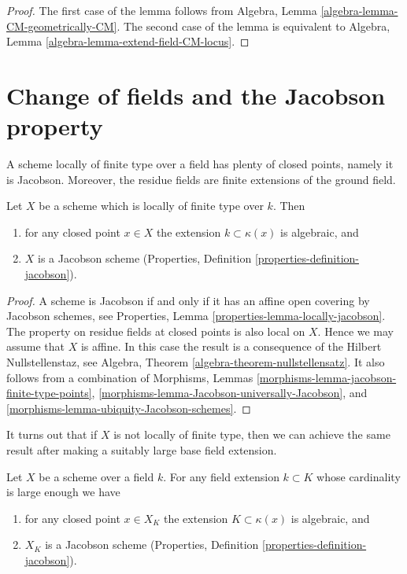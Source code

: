 \begin{proof}
The first case of the lemma follows from
Algebra, Lemma \ref{algebra-lemma-CM-geometrically-CM}.
The second case of the lemma is equivalent to
Algebra, Lemma \ref{algebra-lemma-extend-field-CM-locus}. 
\end{proof}







\section{Change of fields and the Jacobson property}
\label{section-overfield}

\noindent
A scheme locally of finite type over a field has plenty of closed
points, namely it is Jacobson. Moreover, the residue fields are
finite extensions of the ground field.

\begin{lemma}
\label{lemma-locally-finite-type-Jacobson}
Let $X$ be a scheme which is locally of finite type over $k$.
Then
\begin{enumerate}
\item for any closed point $x \in X$ the extension $k \subset \kappa(x)$
is algebraic, and
\item $X$ is a Jacobson scheme
(Properties, Definition \ref{properties-definition-jacobson}).
\end{enumerate}
\end{lemma}

\begin{proof}
A scheme is Jacobson if and only if it has an affine open covering
by Jacobson schemes, see
Properties, Lemma \ref{properties-lemma-locally-jacobson}.
The property on residue fields at closed points is also local on $X$.
Hence we may assume that $X$ is affine. In this case the result
is a consequence of the Hilbert Nullstellenstaz, see
Algebra, Theorem \ref{algebra-theorem-nullstellensatz}.
It also follows from a combination of
Morphisms, Lemmas \ref{morphisms-lemma-jacobson-finite-type-points},
\ref{morphisms-lemma-Jacobson-universally-Jacobson}, and
\ref{morphisms-lemma-ubiquity-Jacobson-schemes}.
\end{proof}

\noindent
It turns out that if $X$ is not locally of finite type, then we can
achieve the same result after making a suitably large base field extension.

\begin{lemma}
\label{lemma-make-Jacobson}
Let $X$ be a scheme over a field $k$.
For any field extension $k \subset K$ whose cardinality is large enough
we have
\begin{enumerate}
\item for any closed point $x \in X_K$ the extension $K \subset \kappa(x)$
is algebraic, and
\item $X_K$ is a Jacobson scheme
(Properties, Definition \ref{properties-definition-jacobson}).
\end{enumerate}
\end{lemma}

